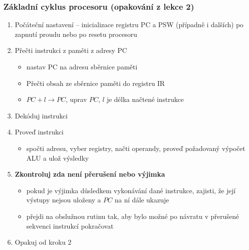 \documentclass{beamer}
\begin{document}
\begin{frame}
\frametitle{Základní cyklus procesoru (opakování z lekce 2)}
\begin{enumerate}
  \item Počáteční nastavení -- inicializace registru PC a PSW (případně i dalších) po zapnutí proudu nebo po resetu procesoru
  \item Přečti instrukci z paměti z adresy PC
  \begin{itemize}
    \item nastav PC na adresu sběrnice paměti
    \item Přečti obsah ze sběrnice paměti do registru IR
    \item $PC+l \to PC$, uprav $PC$, $l$ je délka načtené instrukce
  \end{itemize}
  \item Dekóduj instrukci
  \item Proveď instrukci
  \begin{itemize}
    \item spočti adresu, vyber registry, načti operandy, proveď požadovaný výpočet ALU a ulož výsledky
  \end{itemize}
  \item \textbf{Zkontroluj zda není přerušení nebo výjimka}
  \begin{itemize}
    \item pokud je výjimka důsledkem vykonávání dané instrukce, zajisti, že její výstupy nejsou uloženy a $PC$ na ní dále ukazuje
    \item přejdi na obslužnou rutinu tak, aby bylo možné po návratu v přerušené sekvenci instrukcí pokračovat
  \end{itemize}
  \item Opakuj od kroku 2
\end{enumerate}
\end{frame}
\end{document}
